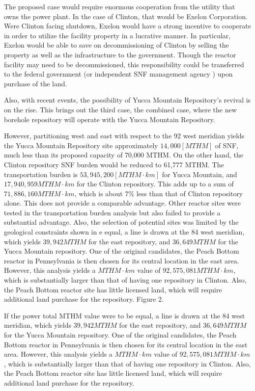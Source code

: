 The proposed case would require enormous cooperation from the utility that owns
the power plant. In the case of Clinton, that would be Exelon Corporation. 
Were Clinton facing shutdown, Exelon would have a strong incentive to 
cooperate in order to utilize the facility property
in a lucrative manner. In particular, Exelon would be able to save on decommissioning of
Clinton by selling the property as well as the infrastructure to the 
government. Though the reactor facility may need to be decommissioned, 
this responsibility could be transferred to the federal government (or 
independent \gls{SNF} management agency \cite{ayers_blue_2012}) upon 
purchase of the land.

Also, with recent events, the possibility of Yucca Mountain Repository's revival
is on the rise. This brings out the third case, the combined case, where the new
borehole repository will operate with the Yucca Mountain Repository. 

However, partitioning west and east with respect to the 92 west meridian yields the Yucca
Mountain Repository site approximately 
$14,000 [MTHM]$ of \gls{SNF}, much less than its proposed capacity of 70,000 \gls{MTHM}. On the other hand, 
the Clinton repository \gls{SNF} burden would be reduced to 61,777 \gls{MTHM}. The transportation burden is 
$53,945,200 [MTHM\cdot km]$  
for Yucca Mountain, and $17,940,959 MTHM\cdot km$ for the Clinton repository. This 
adds up to a sum of $71,886,160 MTHM\cdot km$, which is about 7\% less than that
of Clinton repository alone. This does not provide a comparable advantage. Other
reactor sites were tested in the transportation burden analysis but also failed
to provide a substantial advantage. Also, the selection of potential sites
was limited by the geological constraints shown in e equal, a line is drawn at the 84 west
meridian, which yields $39,942 MTHM$ for the east repository, and $36,649 MTHM$ for
the Yucca Mountain repository. One of the original candidates, the Peach Bottom
reactor in Pennsylvania is then chosen for its central location in the east area.
However, this analysis yields a $MTHM\cdot km$ value of $92,575,081 MTHM\cdot km$,
which is substantially larger than that of having one repository in Clinton. 
Also, the Peach Bottom reactor site has little licensed land, which will require
additional land purchase for the repository. Figure 2.  

If the power total MTHM value were to be equal, a line is drawn at the 84 west
meridian, which yields $39,942 MTHM$ for the east repository, and $36,649 MTHM$ for
the Yucca Mountain repository. One of the original candidates, the Peach Bottom
reactor in Pennsylvania is then chosen for its central location in the east area.
However, this analysis yields a $MTHM\cdot km$ value of $92,575,081 MTHM\cdot km$,
which is substantially larger than that of having one repository in Clinton. 
Also, the Peach Bottom reactor site has little licensed land, which will require
additional land purchase for the repository. 


